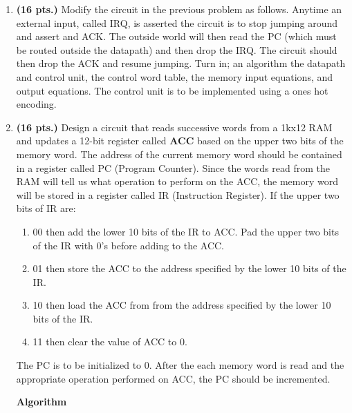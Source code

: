 \begin{enumerate}
\begin{solution}
{} \end{solution}


\item {\bf (16 pts.)}
Modify the circuit in the previous problem as follows.  Anytime
an external input, called IRQ, is asserted the circuit is to stop
jumping around and assert and ACK.  The outside world will then read
the PC (which must be routed outside the datapath) and then drop the 
IRQ.  The circuit should then drop the ACK and resume jumping.
Turn in; an algorithm
the datapath and control unit,
the control word table,
the memory input equations, and
output equations.  
The control unit is to be implemented using a ones hot encoding.

\item  {\bf (16 pts.)} Design a circuit that reads successive words from 
a 1kx12 RAM and
updates a 12-bit register called {\bf ACC} based on the upper two bits of the 
memory word.  The address of the current memory word should be contained
in a register called PC (Program Counter).  Since the words read from the
RAM will tell us what operation to perform on the ACC, the memory word will
be stored in a register called IR (Instruction Register).  If the upper
two bits of IR are:
\begin{enumerate}
\item  00 then add the lower 10 bits of the IR to ACC.  Pad the upper two
	bits of the IR with 0's before adding to the ACC.
\item  01 then store the ACC to the address specified by the 
	lower 10 bits of the IR.
\item  10 then load the ACC from from the address specified by the lower 
	10 bits of the IR.
\item  11 then clear the value of ACC to 0.
\end{enumerate}

The PC is to be initialized to 0.  After the each memory word is read
and the appropriate operation performed on ACC, the PC should be
incremented.

\begin{solution} {

{\bf Algorithm}

}
\end{solution}
\end{enumerate}
